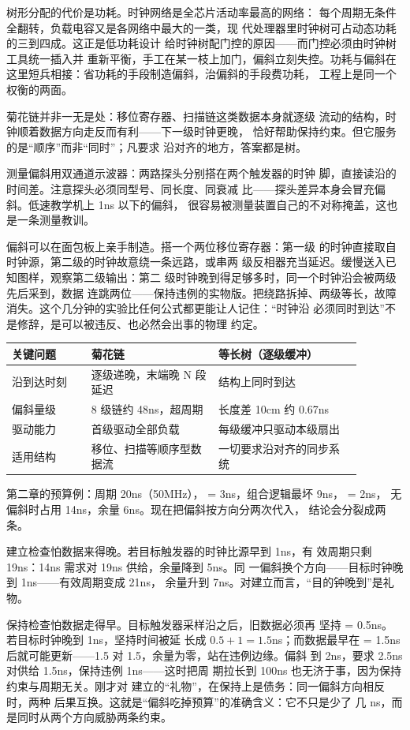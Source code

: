 树形分配的代价是功耗。时钟网络是全芯片活动率最高的网络：
每个周期无条件全翻转，负载电容又是各网络中最大的一类，现
代处理器里时钟树可占动态功耗的三到四成。这正是低功耗设计
给时钟树配门控的原因——而门控必须由时钟树工具统一插入并
重新平衡，手工在某一枝上加门，偏斜立刻失控。功耗与偏斜在
这里短兵相接：省功耗的手段制造偏斜，治偏斜的手段费功耗，
工程上是同一个权衡的两面。

菊花链并非一无是处：移位寄存器、扫描链这类数据本身就逐级
流动的结构，时钟顺着数据方向走反而有利——下一级时钟更晚，
恰好帮助保持约束。但它服务的是“顺序”而非“同时”；凡要求
沿对齐的地方，答案都是树。

测量偏斜用双通道示波器：两路探头分别搭在两个触发器的时钟
脚，直接读沿的时间差。注意探头必须同型号、同长度、同衰减
比——探头差异本身会冒充偏斜。低速教学机上 1ns 以下的偏斜，
很容易被测量装置自己的不对称掩盖，这也是一条测量教训。

偏斜可以在面包板上亲手制造。搭一个两位移位寄存器：第一级
的时钟直接取自时钟源，第二级的时钟故意绕一条远路，或串两
级反相器充当延迟。缓慢送入已知图样，观察第二级输出：第二
级时钟晚到得足够多时，同一个时钟沿会被两级先后采到，数据
连跳两位——保持违例的实物版。把绕路拆掉、两级等长，故障
消失。这个几分钟的实验比任何公式都更能让人记住：“时钟沿
必须同时到达”不是修辞，是可以被违反、也必然会出事的物理
约定。

\begin{longtable}{L{0.2\linewidth}L{0.32\linewidth}L{0.36\linewidth}}
\toprule
关键问题 & 菊花链 & 等长树（逐级缓冲） \\
\midrule
沿到达时刻 & 逐级递晚，末端晚 N 段延迟 & 结构上同时到达 \\
偏斜量级 & 8 级链约 48ns，超周期 & 长度差 10cm 约 0.67ns \\
驱动能力 & 首级驱动全部负载 & 每级缓冲只驱动本级扇出 \\
适用结构 & 移位、扫描等顺序型数据流 & 一切要求沿对齐的同步系统 \\
\bottomrule
\end{longtable}

第二章的预算例：周期 20ns（50MHz），
 = 3ns，组合逻辑最坏 9ns， = 2ns，
无偏斜时占用 14ns，余量 6ns。现在把偏斜按方向分两次代入，
结论会分裂成两条。

建立检查怕数据来得晚。若目标触发器的时钟比源早到 1ns，有
效周期只剩 19ns：14ns 需求对 19ns 供给，余量降到 5ns。同
一偏斜换个方向——目标时钟晚到 1ns——有效周期变成 21ns，
余量升到 7ns。对建立而言，“目的钟晚到”是礼物。

保持检查怕数据走得早。目标触发器采样沿之后，旧数据必须再
坚持  = 0.5ns。若目标时钟晚到 1ns，坚持时间被延
长成 $0.5 + 1 = 1.5$ns；而数据最早在  = 1.5ns
后就可能更新——1.5 对 1.5，余量为零，站在违例边缘。偏斜
到 2ns，要求 2.5ns 对供给 1.5ns，保持违例 1ns——这时把周
期拉长到 100ns 也无济于事，因为保持约束与周期无关。刚才对
建立的“礼物”，在保持上是债务：同一偏斜方向相反时，两种
后果互换。这就是“偏斜吃掉预算”的准确含义：它不只是少了
几 ns，而是同时从两个方向威胁两条约束。

